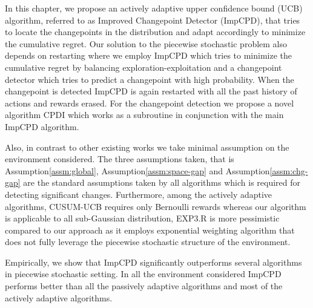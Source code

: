 In this chapter, we propose an actively adaptive upper confidence bound (UCB) algorithm, referred to as Improved Changepoint Detector (ImpCPD), that tries to locate the changepoints in the distribution and adapt accordingly to minimize the cumulative regret. Our solution to the piecewise stochastic problem also depends on restarting where we employ ImpCPD which tries to minimize the cumulative regret by balancing exploration-exploitation and a changepoint detector which tries to predict a changepoint with high probability. When the changepoint is detected ImpCPD is again restarted with all the past history of actions and rewards erased. For the changepoint detection we propose a novel algorithm CPDI which works as a subroutine in conjunction with the main ImpCPD algorithm.



	Also, in contrast to other existing works we take minimal assumption on the environment considered. The three assumptions taken, that is Assumption\ref{assm:global}, Assumption\ref{assm:space-gap} and Assumption\ref{assm:chg-gap} are the standard assumptions taken by all algorithms which is required for detecting significant changes. Furthermore, among the actively adaptive algorithms, CUSUM-UCB requires only Bernoulli rewards whereas our algorithm is applicable to all sub-Gaussian distribution, EXP3.R is more pessimistic compared to our approach as it employs exponential weighting algorithm that does not fully leverage the piecewise stochastic structure of the environment. 
	
	Empirically, we show that ImpCPD significantly outperforms several algorithms in piecewise stochastic setting. In all the environment considered ImpCPD performs better than all the passively adaptive algorithms and most of the actively adaptive algorithms. 
	
